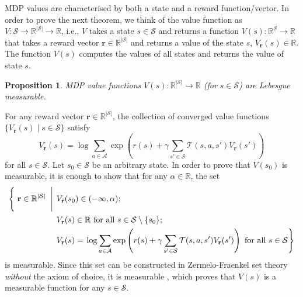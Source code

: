 \documentclass{article}
\newtheorem{proposition}[theorem]{Proposition}
\newenvironment{proofsketch}{%
  \renewcommand{\proofname}{Proof sketch}\proof}{\endproof}
\theoremstyle{definition}
\theoremstyle{remark}
\begin{document}
MDP values are characterised by both a state and a reward function/vector. In
order to prove the next theorem, we think of the value function as $V :
\mathcal{S} \to \mathbb{R}^{|\mathcal{S}|} \to \mathbb{R}$, i.e., $V$ takes a
state $s \in \mathcal{S}$ and returns a function $V(s) :
\mathbb{R}^{\mathcal{S}} \to \mathbb{R}$ that takes a reward vector $\mathbf{r}
\in \mathbb{R}^{|\mathcal{S}|}$ and returns a value of the state $s$,
$V_{\mathbf{r}}(s) \in \mathbb{R}$. The function $V(s)$ computes the values of
all states and returns the value of state $s$.

\begin{proposition} \label{thm:measurability}
  MDP value functions $V(s) : \mathbb{R}^{|\mathcal{S}|} \to \mathbb{R}$ (for $s
  \in \mathcal{S}$) are Lebesgue measurable.
\end{proposition}
\begin{proofsketch}
  For any reward vector $\mathbf{r} \in \mathbb{R}^{|\mathcal{S}|}$, the
  collection of converged value functions $\{ V_{\mathbf{r}}(s) \mid s \in
  \mathcal{S} \}$ satisfy
  \[
    V_{\mathbf{r}}(s) = \log \sum_{a \in \mathcal{A}}
    \exp\left( r(s) + \gamma\sum_{s' \in \mathcal{S}} \mathcal{T}(s, a,
      s')V_{\mathbf{r}}(s') \right)
  \]
  for all $s \in \mathcal{S}$. Let $s_0 \in \mathcal{S}$ be an arbitrary state.
  In order to prove that $V(s_0)$ is measurable, it is enough to show that for
  any $\alpha \in \mathbb{R}$, the set
  \[
    \begin{split}
      \left\{ \vphantom{\sum_{a \in \mathcal{A}}} \right. \mathbf{r} \in
      \mathbb{R}^{|\mathcal{S}|} \left. \vphantom{\sum_{a \in \mathcal{A}}} \;
        \middle| \; \right. &V_{\mathbf{r}}(s_0) \in (-\infty, \alpha); \\
      &V_{\mathbf{r}}(s) \in
      \mathbb{R} \text{ for all } s \in \mathcal{S} \setminus \{ s_0 \}; \\
      &V_{\mathbf{r}}(s) = \left. \log \sum_{a \in \mathcal{A}} \exp\left( r(s)
          + \gamma\sum_{s' \in \mathcal{S}} \mathcal{T}(s, a,
          s')V_{\mathbf{r}}(s') \right) \text{ for all } s \in
        \mathcal{S}\right\}
    \end{split}
  \]
  is measurable. Since this set can be constructed in Zermelo-Fraenkel set
  theory \emph{without} the axiom of choice, it is measurable
  \cite{herrlich2006axiom}, which proves that $V(s)$ is a measurable function
  for any $s \in \mathcal{S}$.
\end{proofsketch}
\end{document}
